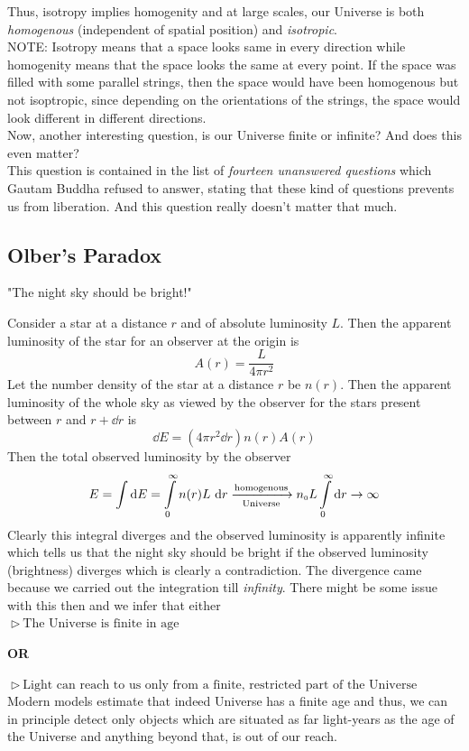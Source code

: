 \noindent
Thus, isotropy implies homogenity and at large scales, our Universe is both \textit{homogenous} (independent of spatial position) and \textit{isotropic}. \\[0.2cm]
NOTE: Isotropy means that a space looks same in every direction while homogenity means that the space looks the same at every point. If the space was filled with some parallel strings, then the space would have been homogenous but not isoptropic, since depending on the orientations of the strings, the space would look different in different directions.\\[0.2cm] Now, another interesting question, is our Universe finite or infinite? And does this even matter? \\[0.2cm]
This question is contained in the list of \textit{fourteen unanswered questions} which Gautam Buddha refused to answer, stating that these kind of questions prevents us from liberation. And this question really doesn't matter that much. 
\subsection{Olber's Paradox}
\begin{center}
    "The night sky should be bright!"
\end{center}
Consider a star at a distance $r$ and of absolute luminosity $L$. Then the apparent luminosity of the star for an observer at the origin is $$A(r) = \frac{L}{4\pi r^2}$$
Let the number density of the star at a distance $r$ be $n(r)$. Then the apparent luminosity of the whole sky as viewed by the observer for the stars present between $r$ and $r+\dd r$ is 
$$\dd E = (4\pi r^2 \dd r) n(r) A(r)$$
Then the total observed luminosity by the observer 
$$E =\int \dd E = \int\limits_0^\infty n(r)L\ \dd r \xrightarrow[\text{Universe}]{\text{homogenous}}   n_{\text{\tiny 0}} L\int\limits_0^\infty \dd r \rightarrow \infty$$
Clearly this integral diverges and the observed luminosity is apparently infinite which tells us that the night sky should be bright if the observed luminosity (brightness) diverges which is clearly a contradiction. The divergence came because we carried out the integration till \textit{infinity}. There might be some issue with this then and we infer that either  \\[0.2cm]
$\vartriangleright \ \text{The Universe is finite in age}$
\begin{center}
    \large \textbf{OR}
\end{center}
$\vartriangleright \ \text{Light can reach to us only from a finite, restricted part of the Universe}$\\[0.2cm]
Modern models estimate that indeed Universe has a finite age and thus, we can in principle detect only objects which are situated as far light-years as the age of the Universe and anything beyond that, is out of our reach. 
